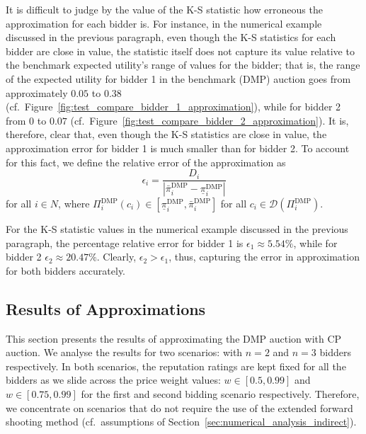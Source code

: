 It is difficult to judge by the value of the K-S statistic how erroneous the approximation for each bidder is. For instance, in the numerical example discussed in the previous paragraph, even though the K-S statistics for each bidder are close in value, the statistic itself does not capture its value relative to the benchmark expected utility's range of values for the bidder; that is, the range of the expected utility for bidder 1 in the benchmark (DMP) auction goes from approximately $0.05$ to $0.38$ (cf.~Figure~\ref{fig:test_compare_bidder_1_approximation}), while for bidder 2 from $0$ to $0.07$ (cf.~Figure~\ref{fig:test_compare_bidder_2_approximation}). It is, therefore, clear that, even though the K-S statistics are close in value, the approximation error for bidder 1 is much smaller than for bidder 2. To account for this fact, we define the relative error of the approximation as
\begin{equation}
  \label{eq:relative_error_approximation}
  \epsilon_i = \frac{D_i}{|\bar{\pi}_i^{\textrm{DMP}} - \underline{\pi}_i^{\textrm{DMP}}|}
\end{equation}
for all $i\in N$, where $\Pi_i^{\textrm{DMP}}(c_i)\in [\underline{\pi}_i^{\textrm{DMP}}, \bar{\pi}_i^{\textrm{DMP}}]$ for all $c_i\in \mathscr{D}(\Pi_i^{\textrm{DMP}})$.

For the K-S statistic values in the numerical example discussed in the previous paragraph, the percentage relative error for bidder 1 is $\epsilon_1\approx 5.54\%$, while for bidder 2 $\epsilon_2\approx 20.47\%$. Clearly, $\epsilon_2 > \epsilon_1$, thus, capturing the error in approximation for both bidders accurately.

\subsection{Results of Approximations} %
\label{sub:results_of_approximations_approximation}
This section presents the results of approximating the DMP auction with CP auction. We analyse the results for two scenarios: with $n=2$ and $n=3$ bidders respectively. In both scenarios, the reputation ratings are kept fixed for all the bidders as we slide across the price weight values: $w\in[0.5, 0.99]$ and $w\in[0.75,0.99]$ for the first and second bidding scenario respectively. Therefore, we concentrate on scenarios that do not require the use of the extended forward shooting method (cf.~assumptions of Section~\ref{sec:numerical_analysis_indirect}).

